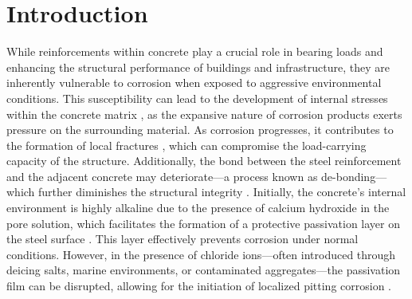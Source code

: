 \documentclass[3p]{elsarticle} %
\begin{document}
\newpage
\tableofcontents

\newpage
{}
\section{Introduction}

While reinforcements within concrete play a crucial role in bearing loads and enhancing the structural performance of buildings and infrastructure, they are inherently vulnerable to corrosion when exposed to aggressive environmental conditions. This susceptibility can lead to the development of internal stresses within the concrete matrix \citep{Page1982, Arya1996}, as the expansive nature of corrosion products exerts pressure on the surrounding material. As corrosion progresses, it contributes to the formation of local fractures \citep{Khan2014, Korec2023, Korec2024b}, which can compromise the load-carrying capacity of the structure. Additionally, the bond between the steel reinforcement and the adjacent concrete may deteriorate—a process known as de-bonding—which further diminishes the structural integrity \citep{Fang2004, Lee2002, Zhao2011, Michel2013}. Initially, the concrete’s internal environment is highly alkaline due to the presence of calcium hydroxide in the pore solution, which facilitates the formation of a protective passivation layer on the steel surface \citep{Page1982, Angst2011}. This layer effectively prevents corrosion under normal conditions. However, in the presence of chloride ions—often introduced through deicing salts, marine environments, or contaminated aggregates—the passivation film can be disrupted, allowing for the initiation of localized pitting corrosion \citep{Wang2021, Angst2019, Macdonald2021, Wang2013}.
\end{document}
